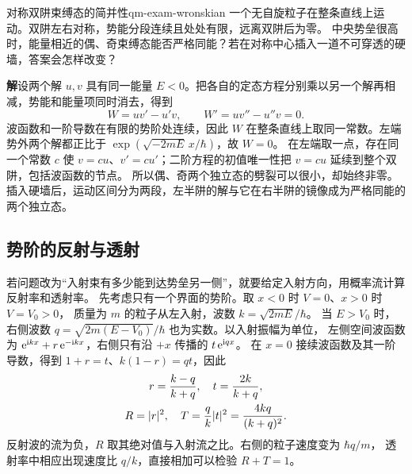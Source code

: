 \begin{example}{对称双阱束缚态的简并性}{qm-exam-wronskian}
    一个无自旋粒子在整条直线上运动。双阱左右对称，势能分段连续且处处有限，远离双阱后为零。
    中央势垒很高时，能量相近的偶、奇束缚态能否严格同能？若在对称中心插入一道不可穿透的硬墙，答案会怎样改变？

    \par\smallskip\textbf{解}\quad 设两个解 $u,v$ 具有同一能量 $E < 0$。把各自的定态方程分别乘以另一个解再相减，势能和能量项同时消去，得到
    \[
        W = uv' - u'v,\qquad W' = uv'' - u''v = 0 .
    \]
    波函数和一阶导数在有限的势阶处连续，因此 $W$ 在整条直线上取同一常数。左端势外两个解都正比于 $\exp(\sqrt{-2mE}\,x/\hbar)$，故 $W = 0$。
    在左端取一点，存在同一个常数 $c$ 使 $v = cu$、$v' = cu'$；二阶方程的初值唯一性把 $v = cu$ 延续到整个双阱，包括波函数的节点。
    所以偶、奇两个独立态的劈裂可以很小，却始终非零。插入硬墙后，运动区间分为两段，左半阱的解与它在右半阱的镜像成为严格同能的两个独立态。
\end{example}

\subsection{势阶的反射与透射}
若问题改为“入射束有多少能到达势垒另一侧”，就要给定入射方向，用概率流计算反射率和透射率。
先考虑只有一个界面的势阶。取 $x < 0$ 时 $V = 0$、$x > 0$ 时 $V = V_0 > 0$，
质量为 $m$ 的粒子从左入射，波数 $k = \sqrt{2mE}/\hbar$。
当 $E > V_0$ 时，右侧波数 $q = \sqrt{2m(E - V_0)}/\hbar$ 也为实数。以入射振幅为单位，
左侧空间波函数为 $\mathop{}\!\mathrm{e}^{\mathrm{i} kx} + r\mathop{}\!\mathrm{e}^{-\mathrm{i} kx}$，右侧只有沿 $+x$ 传播的 $t\mathop{}\!\mathrm{e}^{\mathrm{i} qx}$。
在 $x = 0$ 接续波函数及其一阶导数，得到 $1 + r = t$、$k(1 - r) = qt$，因此
\begin{subequations}
    \begin{gather}
        r = \frac{k - q}{k + q},\quad t = \frac{2k}{k + q},\\
        R = \lvert r\rvert^2,\quad T = \frac{q}{k}\lvert t\rvert^2 = \frac{4kq}{(k + q)^2}.
    \end{gather}
\end{subequations}
反射波的流为负，$R$ 取其绝对值与入射流之比。右侧的粒子速度变为 $\hbar q/m$，
透射率中相应出现速度比 $q/k$，直接相加可以检验 $R + T = 1$。

